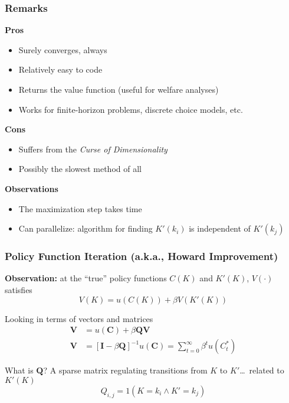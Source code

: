 \documentclass[10pt, aspectratio=1610, handout]{beamer}
\begin{document}
  \begin{frame}
    \frametitle{Remarks}

    \textbf{Pros}
    \begin{itemize}
      \item Surely converges, always
      \item Relatively easy to code
      \item Returns the value function (useful for welfare analyses)
      \item Works for finite-horizon problems, discrete choice models, etc.
    \end{itemize}

    \vfill\pause

    \textbf{Cons}
    \begin{itemize}
      \item Suffers from the \textit{Curse of Dimensionality}
      \item Possibly the slowest method of all
    \end{itemize}

    \vfill\pause

    \textbf{Observations}
    \begin{itemize}
      \item The maximization step takes time
      \item Can parallelize: algorithm for finding $K'(k_i)$ is independent of $K'(k_j)$
    \end{itemize}
  \end{frame}

  \begin{frame}
    \frametitle{Policy Function Iteration (a.k.a., Howard Improvement)}

    \textbf{Observation:} at the ``true'' policy functions $C(K)$ and $K'(K)$, $V(\cdot)$ satisfies
    \begin{equation*}
      V(K) = u(C(K)) + \beta V(K'(K))
    \end{equation*}

    \vfill\pause

    Looking in terms of vectors and matrices
    \begin{align*}
      \mathbf{V} &= u(\mathbf{C}) + \beta \mathbf{Q} \mathbf{V} \\
      \mathbf{V} &= {\left[ \mathbf{I} - \beta \mathbf{Q} \right]}^{-1} u(\mathbf{C}) = \sum_{t=0}^{\infty} \beta^t u(C_t^*)
    \end{align*}

    \vfill\pause

    What is $\mathbf{Q}$? A sparse matrix regulating transitions from $K$ to $K'$\dots\ related to $K'(K)$
    \begin{equation*}
      Q_{i,j} = 1 \left( K = k_i \wedge K' = k_j \right)
    \end{equation*}

  \end{frame}
\end{document}
